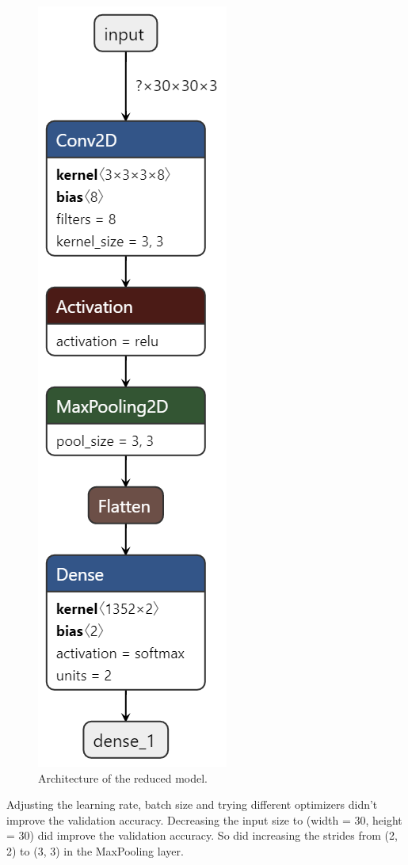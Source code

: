 \documentclass[thesis=M,english]{FITthesis}[2019/03/06]
\begin{document}
\begin{figure}[ht!]
	\centering
	\includegraphics[scale=0.3]{imgs/reduced-model.png}
	\caption{Architecture of the reduced model. }
	\label{label:reduced_model}
\end{figure}


Adjusting the learning rate, batch size and trying different optimizers didn't improve the validation accuracy. Decreasing the input size to (width = 30, height = 30) did improve the validation accuracy. So did increasing the strides from (2, 2) to (3, 3) in the MaxPooling layer.\\
\end{document}
